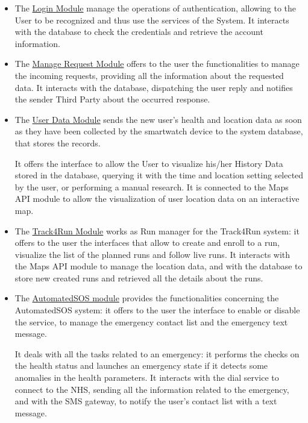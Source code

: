 \begin{itemize}
    \item The \underline{Login Module}  manage the operations of authentication, allowing to the User to be recognized and thus use the services of the System. It interacts with the database to check the credentials and retrieve the account information.
    
    
    \item The \underline{Manage Request Module} offers to the user the functionalities to manage the incoming requests, providing all the information about the requested data. It interacts with the database, dispatching the user reply and notifies the sender Third Party about the occurred response.
    
    
    
    \item The \underline{User Data Module} sends the new user's health and location data as soon as they have been collected by the smartwatch device  to the system database, that stores the records.
    
    It offers the interface to allow the User to visualize his/her History Data stored in the database, querying it with the time and location setting selected by the user, or performing a manual research. It is connected to the Maps API module to allow the visualization of user location data on an interactive map.
    
    
    \item The \underline{Track4Run Module} works as Run manager for the Track4Run system: it offers to the user the interfaces that allow to create and enroll to a run, visualize the list of the planned runs and follow live runs. It interacts with the Maps API module to manage the location data, and with the database to store new created runs and retrieved all the details about the runs. 
    
    \item The \underline{AutomatedSOS module} provides the functionalities concerning the AutomatedSOS system: it offers to the user the interface to enable or disable the service, to manage the emergency contact list and the emergency text message.
    
    It deals with all the tasks related to an emergency: it performs the checks on the health status and launches  an emergency state if it detects some anomalies in the health parameters. It interacts with the dial service to connect to the NHS, sending all the information related to the emergency, and with the SMS gateway, to notify the user's contact list with a text message.
    
    
    
\end{itemize}